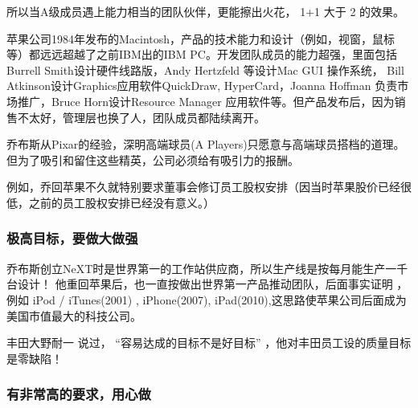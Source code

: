 所以当A级成员遇上能力相当的团队伙伴，更能擦出火花， 1+1 大于 2 的效果。

苹果公司1984年发布的Macintosh，产品的技术能力和设计（例如，视窗，鼠标等）都远远超越了之前IBM出的IBM PC。开发团队成员的能力超强，里面包括 Burrell Smith设计硬件线路版，Andy Hertzfeld 等设计Mac GUI 操作系统， Bill Atkinson设计Graphics应用软件QuickDraw, HyperCard，Joanna Hoffman 负责市场推广，Bruce Horn设计Resource Manager 应用软件等。但产品发布后，因为销售不太好，管理层也换了人，团队成员都陆续离开。

乔布斯从Pixar的经验，深明高端球员(A
Players)只愿意与高端球员搭档的道理。但为了吸引和留住这些精英，公司必须给有吸引力的报酬。

例如，乔回苹果不久就特别要求董事会修订员工股权安排（因当时苹果股价已经很低，之前的员工股权安排已经没有意义。）

\hypertarget{ux6781ux9ad8ux76eeux6807ux8981ux505aux5927ux505aux5f3a}{%
\subsubsection{极高目标，要做大做强}\label{ux6781ux9ad8ux76eeux6807ux8981ux505aux5927ux505aux5f3a}}


乔布斯创立NeXT时是世界第一的工作站供应商，所以生产线是按每月能生产一千台设计！
他重回苹果后，也一直按做出世界第一产品推动团队，后面事实证明 ，例如 iPod
/ iTunes(2001) , iPhone(2007),
iPad(2010),这思路使苹果公司后面成为美国市值最大的科技公司。

丰田大野耐一 说过， ``容易达成的目标不是好目标''
，他对丰田员工设的质量目标是零缺陷！

\hypertarget{ux6709ux975eux5e38ux9ad8ux7684ux8981ux6c42ux7528ux5fc3ux505a}{%
\subsubsection{有非常高的要求，用心做}\label{ux6709ux975eux5e38ux9ad8ux7684ux8981ux6c42ux7528ux5fc3ux505a}}

